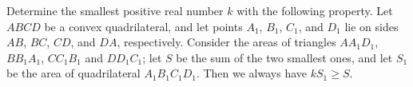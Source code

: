 Determine the smallest positive real number $ k$ with the following property. Let $ ABCD$ be a convex quadrilateral, and let points $ A_1$,  $ B_1$,  $ C_1$,  and $ D_1$ lie on sides $ AB$,  $ BC$,  $ CD$,  and $ DA$,  respectively. Consider the areas of triangles $ AA_1D_1$,  $ BB_1A_1$,  $ CC_1B_1$ and $ DD_1C_1$; let $ S$ be the sum of the two smallest ones, and let $ S_1$ be the area of quadrilateral $ A_1B_1C_1D_1$. Then we always have $ kS_1\ge S$.
